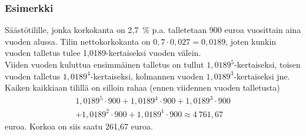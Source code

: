 \documentclass{article}\usepackage[]{graphicx}\usepackage[]{color}
\theoremstyle{remark}
\newtheorem{esim}{Esimerkki}
\newtheorem{ratkaisu}{Ratkaisuehdotus}
\newcommand{\pblock}{\\ \vspace{0.5cm}\pause}
\begin{document}
% 

\begin{frame}
    \frametitle{Esimerkki}  
    Säästötilille, jonka korkokanta on 2{,}7~\% p.a. talletetaan 900 euroa vuosittain aina vuoden alussa. 
    \pause 
    Tilin nettokorkokanta on \(0,7\cdot0{,}027 = 0{,}0189\), joten kunkin vuoden talletus tulee 1{,}0189-kertaiseksi vuoden välein. 
    \pblock 
    Viiden vuoden kuluttua ensimmäinen talletus on tullut \(1{,}0189^5\)-kertaiseksi\pause, toisen vuoden talletus \(1{,}0189^4\)-kertaiseksi\pause, kolmannen vuoden \(1{,}0189^3\)-kertaiseksi jne. \pause Kaiken kaikkiaan tilillä on silloin rahaa (ennen viidennen vuoden talletusta)
    \begin{multline*}
        1{,}0189^5\cdot900 + 1{,}0189^4\cdot900 + 1{,}0189^3\cdot900 \\  + 1{,}0189^2\cdot900 + 1{,}0189^1\cdot900 \approx 4~761{,}67
    \end{multline*}
    euroa. 
    \pause 
    Korkoa on siis saatu 261{,}67 euroa.
\end{frame}
\end{document}
